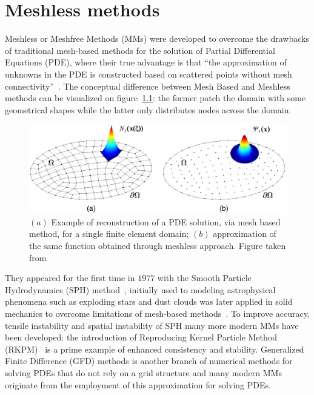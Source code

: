 \chapter{Meshless methods}
\label{chap:meshless_methods}

Meshless or Meshfree Methods (MMs) were developed to overcome the drawbacks of traditional mesh-based methods for the solution of Partial Differential Equations (PDE), where their true advantage is that ``the approximation of unknowns in the PDE is constructed based on scattered points without mesh connectivity''~\cite{Chen:meshless_overview_after_20_years}. The conceptual difference between Mesh Based and Meshless methods can be visualized on figure~\ref{fig:mesh_vs_meshless}: the former patch the domain with some geometrical shapes while the latter only distributes nodes across the domain.

\begin{figure}
	\centering
	\includegraphics[width=\textwidth]{img/mesh_vs_meshless.png}
	\caption{$(a)$ Example of reconstruction of a PDE solution, via mesh based method, for a single finite element domain; $(b)$ approximation of the same function obtained through meshless approach. Figure taken from~\cite{Chen:meshless_overview_after_20_years}}
	\label{fig:mesh_vs_meshless}
\end{figure}

They appeared for the first time in $1977$ with the Smooth Particle Hydrodynamics (SPH) method~\cite{Belytschko:meshless_overview}, initially used to modeling astrophysical phenomena such as exploding stars and dust clouds was later applied in solid mechanics to overcome limitations of mesh-based methods~\cite{Benz:SPH_on_solid_mechanics}. To improve accuracy, tensile instability and spatial instability of SPH many more modern MMs have been developed: the introduction of Reproducing Kernel Particle Method (RKPM)~\cite{Liu:RKPM} is a prime example of enhanced consistency and stability.
Generalized Finite Difference (GFD) methods is another branch of numerical methods for solving PDEs that do not rely on a grid structure and many modern MMs originate from the employment of this approximation for solving PDEs.

